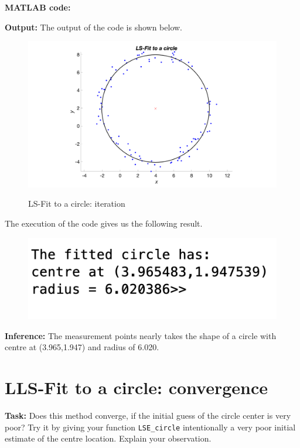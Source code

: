 \noindent \textbf{MATLAB code:} 


\noindent \textbf{Output:} The output of the code is shown below. 
\begin{figure}[H]
\centering
{\includegraphics[scale=0.13]{ass7_1.png}}
\caption{LS-Fit to a circle: iteration }
\label{LS-Fit to a circle: iteration }
\end{figure}

\noindent The execution of the code gives us the following result.
\begin{figure}[H]
\centering
{\includegraphics[scale=0.75]{ass7_2.png}}
\end{figure}
\noindent \textbf{Inference:} The measurement points nearly takes the shape of a circle with centre at (3.965,1.947) and radius of 6.020.



\section{ LLS-Fit to a circle: convergence}  \label{ LS-Fit to a circle: convergence }
\noindent \textbf{Task:} Does this method converge, if the initial guess of the circle center is very poor? Try it by giving your function \texttt{LSE\_circle} intentionally a very poor initial estimate of the centre location. Explain your observation.

